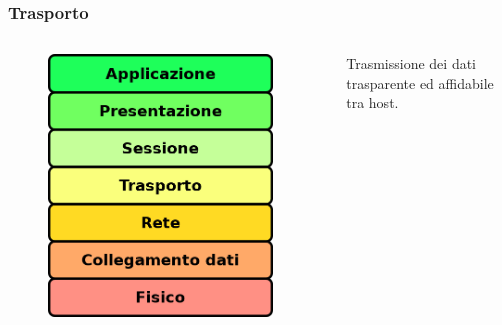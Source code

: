 \documentclass{beamer}
\begin{document}
\subsubsection*{Trasporto}
\begin{frame}{\insertsection}{\insertsubsection}
\begin{columns}
\begin{figure}
\includegraphics[width=0.95\textwidth]{imgs/01-iso-osi.drawio.png}
\end{figure}
\begin{block}{\insertsubsubsection}
Trasmissione dei dati trasparente ed affidabile tra host.
\end{block}
\end{columns}
\end{frame}
\end{document}
